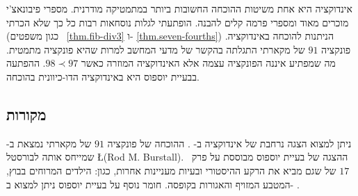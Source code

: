 אינדוקציה היא אחת משיטות ההוכחה החשובות ביותר במתמטיקה מודרנית. מספרי פיבונאצ'י
מוכרים מאוד ומספרי פרמה 
קלים להבנה. הופתעתי לגלות נוסחאות רבות כל כך שלא הכרתי (כגון משפטים%
~\ref{thm.fib-div3}
ו-%
\ref{thm.seven-fourths})
הניתנות להוכחה באינדוקציה. פונקציה
$91$
של מקארתי
התגלתה בהקשר של מדעי המחשב למרות שהיא פונקציה מתמטית. מה שמפתיע איננה הפונקציה עצמה אלא האינדוקציה המוזרה כאשר 
$98\prec 97$. 
ההפתעה בבעיית יוספוס
היא באינדוקציה הדו-כיוונית בהוכחה.

\subsection*{מקורות}

ניתן למצוא הצגה נרחבת של אינדוקציה ב-%
\cite{gunderson}.
ההוכחה של פונקציה 
$91$
של מקארתי
נמצאת ב-%
\cite{manna}
שמייחס אותה לבורסטל
\L{(Rod M. Burstall)}.
ההצגה של בעיית יוספוס
מבוססת על פרק~%
$17$
של
\cite{gunderson}
שגם מביא את הרקע ההיסטורי ובעיות מעניינות אחרות, כגון: הילדים המרוחים בבוץ, המטבע המזויף והאגורות בקופסה. חומר נוסף על בעיית יוספוס
ניתן למצוא ב-%
\cite{schumer,wiki:josephus}.
